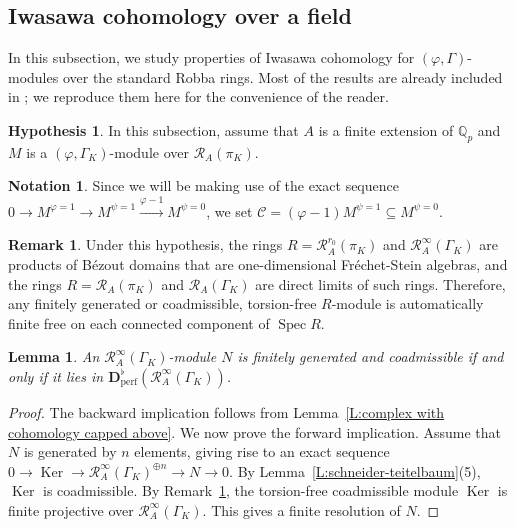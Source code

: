\documentclass[12pt]{article}
\newtheorem{lemma}[theorem]{Lemma}
\theoremstyle{definition}
\newtheorem{hypothesis}[theorem]{Hypothesis}
\newtheorem{remark}[theorem]{Remark}
\newtheorem{notation}[theorem]{Notation}
\numberwithin{equation}{theorem}
\newcommand{\calR}{\mathcal{R}}
\newcommand{\QQ}{\mathbb{Q}}
\newcommand{\bbD}{\mathbf{D}}
\newcommand{\scrC}{\mathscr{C}}
\newcommand{\perf}{\mathrm{perf}}
\def\Qp{\QQ_p}
\DeclareMathOperator{\Ker}{Ker}
\DeclareMathOperator{\Spec}{Spec}
\begin{document}
\subsection{Iwasawa cohomology over a field}

In this subsection, we study properties of Iwasawa cohomology for $(\varphi, \Gamma)$-modules over the standard Robba rings.  Most of the results are already included in \cite{pottharst2}; we reproduce them here for the convenience of the reader.

\begin{hypothesis}
In this subsection, assume that  $A$ is a finite extension of $\Qp$ and $M$ is a $(\varphi, \Gamma_K)$-module over $\calR_A(\pi_K)$.
\end{hypothesis}

\begin{notation}
Since we will be making use of the exact sequence $0 \to M^{\varphi=1}
\to M^{\psi=1} \xrightarrow{\varphi-1} M^{\psi=0}$, we set $\scrC =
(\varphi-1)M^{\psi=1} \subseteq M^{\psi=0}$.
\end{notation}

\begin{remark}
\label{R:Bezout+torsion free=>free}
Under this hypothesis, the rings $R = \calR_A^{r_0}(\pi_K)$ and
$\calR_A^\infty(\Gamma_K)$ are products of B\'ezout domains that are
one-dimensional Fr\'echet-Stein algebras, and the rings $R =
\calR_A(\pi_K)$ and $\calR_A(\Gamma_K)$ are direct limits of such
rings.  Therefore, any finitely generated or coadmissible,
torsion-free $R$-module is automatically finite free on each connected
component of $\Spec R$.
\end{remark}


\begin{lemma}\label{L:A=field finite coad = perfect}
An $\calR_A^\infty(\Gamma_K)$-module $N$ is finitely generated and coadmissible if and only if it lies in $\bbD^\flat_\perf(\calR_A^\infty(\Gamma_K))$.
\end{lemma}
\begin{proof}
The backward implication follows from Lemma~\ref{L:complex with cohomology capped above}.  We now prove the forward implication.  Assume that $N$ is generated by $n$ elements, giving rise to an exact sequence $0 \to \Ker \to \calR_A^\infty(\Gamma_K)^{\oplus n} \to N \to 0$.
By Lemma~\ref{L:schneider-teitelbaum}(5),  $\Ker$ is coadmissible. By Remark~\ref{R:Bezout+torsion free=>free}, the torsion-free coadmissible module $\Ker$ is finite projective over $\calR_A^\infty(\Gamma_K)$.  This gives a finite resolution of $N$.
\end{proof}
\end{document}
